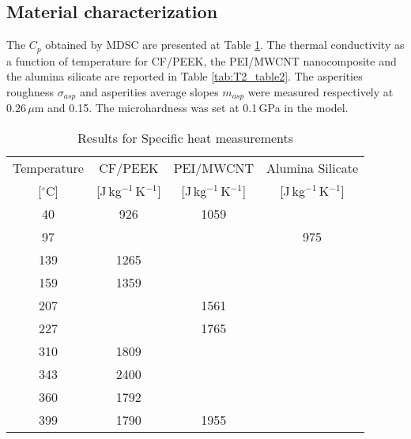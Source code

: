 \subsection{Material characterization}

The $C_p$ obtained by MDSC are presented at Table \ref{tab:T2_table1}. 
The thermal conductivity as a function of temperature for CF/PEEK, the PEI/MWCNT nanocomposite and the alumina silicate are reported in Table \ref{tab:T2_table2}. 
The asperities roughness $\sigma_{asp}$ and asperities average slopes $m_{asp}$ were measured respectively at \mbox{0.26\,$\mu$m} and 0.15. 
The microhardness was set at \mbox{0.1\,GPa} in the model. 

\begin{table}[ht]
	\centering
	\caption{Results for Specific heat measurements}
	\begin{tabular}{@{}cccc@{}}
		\toprule
		   Temperature    &           CF/PEEK            &          PEI/MWCNT           &       Alumina Silicate       \\
		{[}$^{\circ}$C{]} & {[}J\,kg$^{-1}$\,K$^{-1}${]} & {[}J\,kg$^{-1}$\,K$^{-1}${]} & {[}J\,kg$^{-1}$\,K$^{-1}${]} \\ \midrule
		       40         &             926              &             1059             &                              \\
		       97         &                              &                              &             975              \\
		       139        &             1265             &                              &                              \\
		       159        &             1359             &                              &                              \\
		       207        &                              &             1561             &                              \\
		       227        &                              &             1765             &                              \\
		       310        &             1809             &                              &                              \\
		       343        &             2400             &                              &                              \\
		       360        &             1792             &                              &                              \\
		       399        &             1790             &             1955             &                              \\ \bottomrule
	\end{tabular}
	\label{tab:T2_table1}
\end{table}

